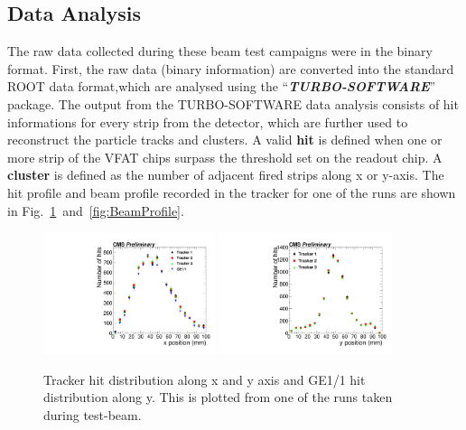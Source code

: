 \subsection{Data Analysis} %
\label{sub:test_beam_analysis}
The raw data collected during these beam test campaigns were in the binary format.
First, the raw data (binary information) are converted into the standard ROOT data format,which are analysed using the ``\textit{\textbf{TURBO-SOFTWARE}}''~\cite{git-trubosoftware} package.
The output from the TURBO-SOFTWARE data analysis consists of hit informations for every strip from the detector, which are further used to reconstruct the particle tracks and clusters.
A valid \textbf{hit} is defined when one or more strip of the VFAT chips surpass the threshold set on the readout chip.
A \textbf{cluster} is defined as the number of adjacent fired strips along x or y-axis.
The hit profile and beam profile recorded in the tracker for one of the runs are shown in Fig.~\ref{fig:HitPosXaxis}~and~\ref{fig:BeamProfile}.
\begin{figure}[!htbp]
\centering
\includegraphics[width=0.45\textwidth]{figures/GEM/Tracker_Hit_position_Run1644_x.pdf}%
\includegraphics[width=0.45\textwidth]{figures/GEM/Tracker_Hit_position_Run1644_y.pdf}
\caption{Tracker hit distribution along x and y axis and GE1/1 hit distribution along y. This is plotted from one of the runs taken during test-beam.}
\label{fig:HitPosXaxis}
\end{figure}

